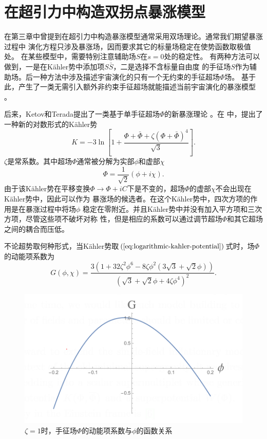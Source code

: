 \section{在超引力中构造双拐点暴涨模型}
在第三章中曾提到在超引力中构造暴涨模型通常采用双场理论。通常我们期望暴涨过程中
演化方程只涉及暴涨场，因而要求其它的标量场稳定在使势函数取极值处。
在某些模型中，需要特别注意辅助场$S$在$s=0$处的稳定性。
有两种方法可以做到，一是在K\"ahler势中添加项$S\bar{S}$，二是选择不含标量自由度
的手征场$S$作为辅助场。后一种方法中涉及描述宇宙演化的只有一个无约束的手征超场$\Phi$场。
基于此，产生了一类无需引入额外非约束手征超场就能描述当前宇宙演化的暴涨模型
\citep{kallosh2015inflation,dall2014sgoldstino,linde2015does} 。


后来，Ketov和Terada提出了一类基于单手征超场$\Phi$的新暴涨理论
\citep{ketov2014generic,ketov2014inflation}。在 \citep{ketov2014generic}
中，提出了一种新的对数形式的K\"ahler势
\begin{equation}
  \label{eq:logarithmic-kahler-potential}
  K =
-3\ln \left[1+\frac{\Phi+\bar{\Phi}+\zeta{\left(\Phi+\bar{\Phi}\right)}^{4}}{\sqrt{3}}\right].
\end{equation}
$\zeta$是常系数。其中超场$\Phi$通常被分解为实部$\phi$和虚部$\chi$
\begin{equation}
  \Phi = \frac{1}{\sqrt{2}}(\phi+i\chi). 
\end{equation}
由于该K\"ahler势在平移变换$\Phi\rightarrow
\Phi+iC$下是不变的，超场$\Phi$的虚部$\chi$不会出现在K\"ahler势中，因此可以作为
暴涨场的候选者。在这个K\"ahler势中，四次方项的作用是在暴涨过程中将场$\phi$
稳定在零附近。并且K\"ahler势中并没有加入平方项和三次方项，尽管这些项不破坏对称
性，但是相应的系数可以通过调节超场$\Phi$和其它超场之间的耦合而压低。

不论超势取何种形式，当K\"ahler势取$(\ref{eq:logarithmic-kahler-potential})$式时，场$\Phi$的动能项系数为
\begin{equation}
  \label{eq:kinetic-coefficient-of-Phi}
  G(\phi,\chi) =
  \frac{3(1+32\zeta^2\phi^{6}-8\zeta\phi^2(3\sqrt{3}+\sqrt{2}\phi))}{{\left(\sqrt{3}+\sqrt{2}\phi+4\zeta\phi^{4}\right)}^2}.
\end{equation}

\begin{figure}[!http]
  \centering
  \includegraphics[width=5in]{Img/kinetic_coefficient_for_Phi.png}
  \caption{$\zeta=1$时，手征场$\Phi$的动能项系数与$\phi$的函数关系}\label{fig:kinetic-coefficient_for_Phi}
\end{figure}

